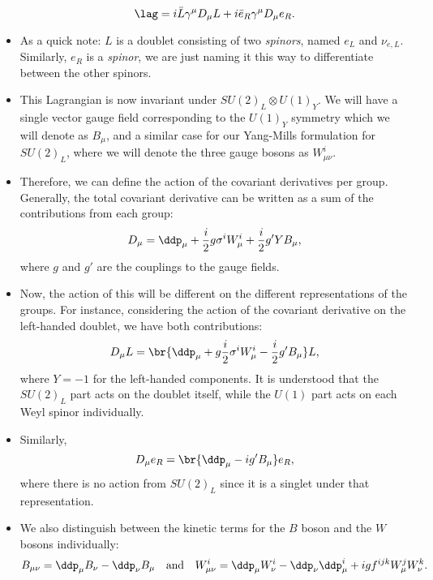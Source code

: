 \begin{itemize}
\begin{equation}
            \lag = i\bar{L} \gamma^{\mu}D_{\mu} L + i\bar{e}_R \gamma^{\mu}D_{\mu} e_R.
        \end{equation}
    \item As a quick note: $L$ is a doublet consisting of two \textit{spinors}, named $e_L$ and $\nu_{e,L}$. Similarly, $e_R$ is a \textit{spinor}, we are just naming it this way to differentiate between the other spinors.
    \item This Lagrangian is now invariant under $SU(2)_L \otimes U(1)_Y$. We will have a single vector gauge field corresponding to the $U(1)_Y$ symmetry which we will denote as $B_{\mu}$, and a similar case for our Yang-Mills formulation for $SU(2)_L$, where we will denote the three gauge bosons as $W_{\mu\nu}^i$.
    \item Therefore, we can define the action of the covariant derivatives per group. Generally, the total covariant derivative can be written as a sum of the contributions from each group:
        \begin{equation}
            D_{\mu} = \ddp_{\mu} + \frac{i}{2}g \sigma^iW_{\mu}^i + \frac{i}{2}g' Y B_{\mu},
        \end{equation}
        where $g$ and $g'$ are the couplings to the gauge fields.
    \item Now, the action of this will be different on the different representations of the groups. For instance, considering the action of the covariant derivative on the left-handed doublet, we have both contributions:
        \begin{equation}
            D_{\mu}L = \br{\ddp_{\mu} + g\frac{i}{2}\sigma^iW_{\mu}^i - \frac{i}{2}g' B_{\mu}}L,
        \end{equation}
        where $Y=-1$ for the left-handed components. It is understood that the $SU(2)_L$ part acts on the doublet itself, while the $U(1)$ part acts on each Weyl spinor individually.
    \item Similarly,
        \begin{equation}
            D_{\mu}e_R = \br{\ddp_{\mu} - ig'B_{\mu}}e_R,
        \end{equation}
        where there is no action from $SU(2)_L$ since it is a singlet under that representation.
    \item We also distinguish between the kinetic terms for the $B$ boson and the $W$ bosons individually:
        \begin{equation}
            B_{\mu\nu} = \ddp_{\mu}B_{\nu} - \ddp_{\nu}B_{\mu} \quad\mathrm{and}\quad W_{\mu\nu}^i = \ddp_{\mu}W_{\nu}^i - \ddp_{\nu}\ddp_{\mu}^i + ig f^{ijk}W_{\mu}^jW_{\nu}^k.

\end{equation}
\end{itemize}
